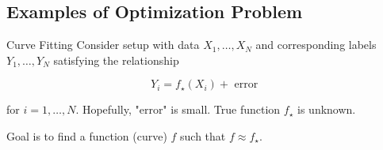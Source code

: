 \subsection{Examples of Optimization Problem}

\begin{frame}[allowframebreaks]

\begin{myexampleblock}{1.4}{Curve Fitting}
    Consider setup with data $X_{1}, \ldots, X_{N}$ and corresponding labels $Y_{1}, \ldots, Y_{N}$ satisfying the relationship

    $$
    Y_{i}=f_{\star}\left(X_{i}\right)+\text { error }
    $$

    for $i=1, \ldots, N$. Hopefully, "error" is small. True function $f_{\star}$ is unknown.

    Goal is to find a function (curve) $f$ such that $f \approx f_{\star}$.
\end{myexampleblock}

\end{frame}

